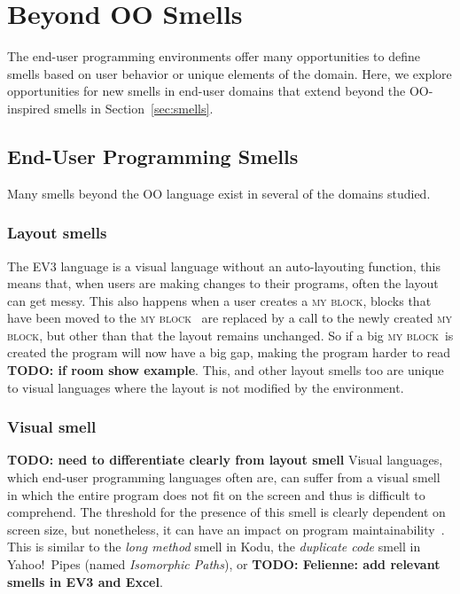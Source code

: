 \documentclass{sig-alternate}
\newcommand{\todo}[1]{\textbf{TODO: #1}}
\newcommand{\mb}{\textsc{my block}}
\begin{document}
\section{Beyond OO Smells}
\label{sec:beyond}

\label{sec:smells:domain}
The end-user programming environments offer many opportunities to define smells based on user behavior or unique elements of the domain. Here, we explore opportunities for new smells in end-user domains that extend beyond the OO-inspired smells in Section~\ref{sec:smells}. 

\subsection{End-User Programming Smells}
Many smells beyond the OO language exist in several of the domains studied. 

\subsubsection{Layout smells}
The EV3 language is a visual language without an auto-layouting function, this means that, when users are making changes to their programs, often the layout can get messy. This also happens when a user creates a \mb, blocks that have been moved to the \mb~ are replaced by a call to the newly created \mb, but other than that the layout remains unchanged. So if a big \mb~is created the program will now have a big gap, making the program harder to read \todo{if room show example}. This, and other layout smells too are unique to visual languages where the layout is not modified by the environment.



	\subsubsection{Visual smell}
	\todo{need to differentiate clearly from layout smell}
	Visual languages, which end-user programming languages often are, can suffer from a visual smell in which the entire program does not fit on the screen and thus is difficult to comprehend. The threshold for the presence of this smell is clearly dependent on screen size, but nonetheless, it can have an impact on program maintainability~\cite{StoleeTSE2013}. 
	This is similar to the \emph{long method} smell in Kodu, the \emph{duplicate code} smell in Yahoo!\ Pipes (named \emph{Isomorphic Paths}), or \todo{Felienne: add relevant smells in EV3 and Excel}. 
	
\end{document}
